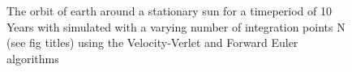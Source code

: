 \documentclass[10pt,showpacs,preprintnumbers,footinbib,amsmath,amssymb,aps,prl,twocolumn,groupedaddress,superscriptaddress,showkeys]{revtex4-1}
\begin{document}
\begin{figure}[h!p]
  \caption{The orbit of earth around a stationary sun for a timeperiod of 10 Years with simulated with a varying number of integration points N (see fig titles) using the Velocity-Verlet and Forward Euler algorithms}
  \label{fig:3c_earthsun}
\end{figure}
 
\end{document}

